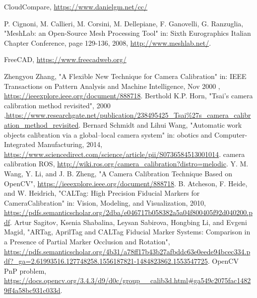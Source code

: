\begin{thebibliography}{1}
		CloudCompare,
		\url{https://www.danielgm.net/cc/}

		P. Cignoni, M. Callieri, M. Corsini, M. Dellepiane, F. Ganovelli, G. Ranzuglia,
		"MeshLab: an Open-Source Mesh Processing Tool" in: Sixth Eurographics Italian Chapter Conference, page 129-136, 2008, \url{http://www.meshlab.net/}.

		FreeCAD,
		\url{https://www.freecadweb.org/}


		Zhengyou Zhang,
		"A Flexible New Technique for Camera Calibration" in: IEEE Transactions on Pattern Analysis and Machine Intelligence, Nov 2000 , \url{https://ieeexplore.ieee.org/document/888718}.
		Berthold K.P. Horn,
		"Tsai’s camera calibration method revisited", 2000 ,\url{https://www.researchgate.net/publication/238495425_Tsai%27s_camera_calibration_method_revisited}.
		Bernard Schmidt and Lihui Wang,
		"Automatic work objects calibration via a global–local camera system" in: obotics and Computer-Integrated Manufacturing, 2014, \url{https://www.sciencedirect.com/science/article/pii/S0736584513001014}.
		camera calibration ROS, 
		\url{http://wiki.ros.org/camera_calibration?distro=melodic}.
		Y. M. Wang,  Y. Li, and J. B. Zheng,
		"A Camera Calibration Technique Based on OpenCV", \url{https://ieeexplore.ieee.org/document/888718}.
		B. Atcheson, F. Heide, and W. Heidrich,
		"CALTag: High Precision Fiducial Markers for CameraCalibration" in: Vision, Modeling, and Visualization, 2010, \url{https://pdfs.semanticscholar.org/2dba/e046717b058382a5a04f800405f92d040200.pdf}.
		Artur Sagitov, Ksenia Shabalina, Leysan Sabirova, Hongbing Li, and Evgeni Magid,
		"ARTag, AprilTag and CALTag Fiducial Marker Systems: Comparison in a Presence of Partial Marker Occlusion and Rotation", \url{https://pdfs.semanticscholar.org/4b31/a78ff17b43b27afbddc63e0eede94bcec334.pdf?_ga=2.61993516.127748258.1556187821-1484823862.1553547725}.
		OpenCV PnP problem, \url{https://docs.opencv.org/3.4.3/d9/d0c/group__calib3d.html#ga549c2075fac14829ff4a58bc931c033d}.




\end{thebibliography}
